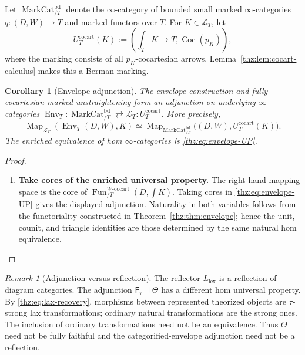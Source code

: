 \documentclass[oneside]{article}
\theoremstyle{plain}
\newtheorem{corollary}[theorem]{Corollary}
\theoremstyle{definition}
\theoremstyle{remark}
\newtheorem{remark}[theorem]{Remark}
\newcommand{\Env}{\operatorname{Env}}
\newcommand{\Fun}{\operatorname{Fun}}
\newcommand{\Map}{\operatorname{Map}}
\newcommand{\coc}{\mathrm{cocart}}
\begin{document}
Let $\operatorname{MarkCat}^{\mathrm{bd}}_{/T}$ denote the $\infty$-category
of bounded small marked $\infty$-categories $q:(D,W)\to T$ and marked
functors over $T$.  For $K\in\mathcal L_T$, let
\[
 U_T^{\coc}(K):=
 \left(\int_TK\longrightarrow T,\operatorname{Coc}(p_K)\right),
\]
where the marking consists of all $p_K$-cocartesian arrows.
Lemma~\ref{thz:lem:cocart-calculus} makes this a Berman marking.

\begin{corollary}[Envelope adjunction]\label{thz:cor:envelope-adjunction}
The envelope construction and fully cocartesian-marked unstraightening form
an adjunction on underlying $\infty$-categories $\Env_T: \operatorname{MarkCat}^{\mathrm{bd}}_{/T} \rightleftarrows \mathcal L_T:U_T^{\coc}.$ More precisely,
\[
 \Map_{\mathcal L_T}(\Env_T(D,W),K)
 \simeq
 \Map_{\operatorname{MarkCat}^{\mathrm{bd}}_{/T}}
 \bigl((D,W),U_T^{\coc}(K)\bigr).
\]
The enriched equivalence of hom $\infty$-categories is
\eqref{thz:eq:envelope-UP}.
\end{corollary}
\begin{proof}
\leavevmode
\begin{enumerate}
\item \textbf{Take cores of the enriched universal property.} The right-hand mapping space is the core of
$\Fun^{W\text{-}\coc}_{/T}(D,\int K)$.  Taking cores in
\eqref{thz:eq:envelope-UP} gives the displayed adjunction.  Naturality in both
variables follows from the functoriality constructed in
Theorem~\ref{thz:thm:envelope}; hence the unit, counit, and triangle identities
are those determined by the same natural hom equivalence.\qedhere
\end{enumerate}
\end{proof}

\begin{remark}[Adjunction versus reflection]
The reflector $L_{\mathrm{lex}}$ is a reflection of diagram categories.
The adjunction $\mathsf F_\tau\dashv\Theta$ has a different hom universal
property.  By \eqref{thz:eq:lax-recovery}, morphisms between represented
theorized objects are $\tau$-strong lax transformations; ordinary natural
transformations are the strong ones.  The inclusion of ordinary
transformations need not be an equivalence.  Thus $\Theta$ need not be
fully faithful and the categorified-envelope adjunction need not be a
reflection.
\end{remark}
\end{document}
